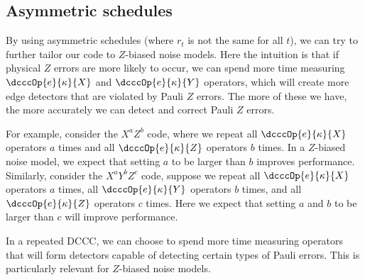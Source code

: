 \subsection{Asymmetric schedules}\label{subsubsec:repeating_measurements_asymmetric_schedules}

By using asymmetric schedules (where $r_t$ is not the same for all $t$), we can try to further tailor our code to $Z$-biased noise models.
Here the intuition is that if physical $Z$ errors are more likely to occur, we can spend more time measuring $\dcccOp{e}{\kappa}{X}$ and $\dcccOp{e}{\kappa}{Y}$ operators, which will create more edge detectors that are violated by Pauli $Z$ errors.
The more of these we have, the more accurately we can detect and correct Pauli $Z$ errors.

For example, consider the $X^a Z^b$ code, where we repeat all $\dcccOp{e}{\kappa}{X}$ operators $a$ times
and all $\dcccOp{e}{\kappa}{Z}$ operators $b$ times.
In a $Z$-biased noise model, we expect that setting $a$ to be larger than $b$ improves performance.
Similarly, consider the $X^a Y^b Z^c$ code, suppose we repeat all $\dcccOp{e}{\kappa}{X}$ operators $a$ times, all $\dcccOp{e}{\kappa}{Y}$ operators $b$ times, and all $\dcccOp{e}{\kappa}{Z}$ operators $c$ times.
Here we expect that setting $a$ and $b$ to be larger than $c$ will improve performance.

\begin{difference}\label{dif:repeating_asymmetric_schedule}
In a repeated DCCC, we can choose to spend more time measuring operators that will form detectors capable of detecting certain types of Pauli errors.
This is particularly relevant for $Z$-biased noise models.
\end{difference}

